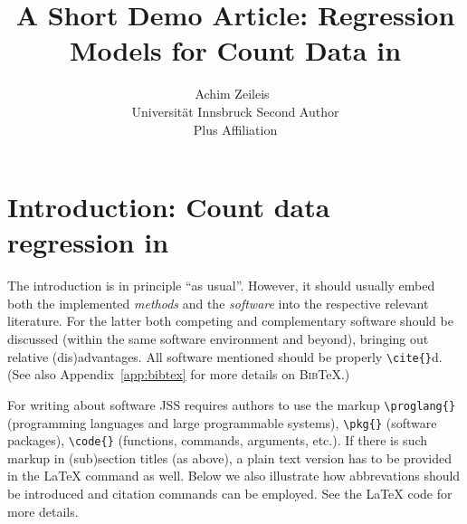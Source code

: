 \documentclass[article]{jss}
\author{Achim Zeileis~\orcidlink{0000-0003-0918-3766}\\Universit\"at Innsbruck
   \And Second Author\\Plus Affiliation}
\title{A Short Demo Article: Regression Models for Count Data in \proglang{R}}
\begin{document}





\section[Introduction: Count data regression in R]{Introduction: Count data regression in } \label{sec:intro}

\begin{leftbar}
The introduction is in principle ``as usual''. However, it should usually embed
both the implemented \emph{methods} and the \emph{software} into the respective
relevant literature. For the latter both competing and complementary software
should be discussed (within the same software environment and beyond), bringing
out relative (dis)advantages. All software mentioned should be properly
\verb|\cite{}|d. (See also Appendix~\ref{app:bibtex} for more details on
\textsc{Bib}{\TeX}.)

For writing about software JSS requires authors to use the markup
\verb|\proglang{}| (programming languages and large programmable systems),
\verb|\pkg{}| (software packages), \verb|\code{}| (functions, commands,
arguments, etc.). If there is such markup in (sub)section titles (as above), a
plain text version has to be provided in the {\LaTeX} command as well. Below we
also illustrate how abbrevations should be introduced and citation commands can
be employed. See the {\LaTeX} code for more details.
\end{leftbar}
\end{document}
